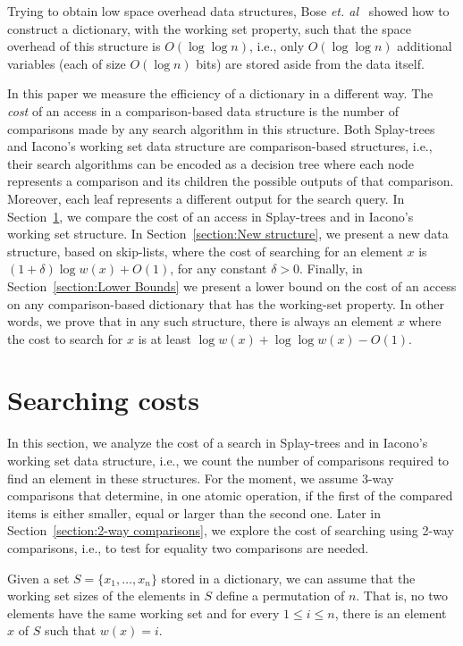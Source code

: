 \documentclass[11pt]{article}       %
\begin{document}
Trying to obtain low space overhead data structures, Bose \emph{et. al}~\cite{bose2012distribution} showed how to construct a dictionary, with the working set property, such that the space overhead of this structure is $O(\log \log n)$, i.e., only $O(\log\log n)$ additional variables (each of size $O(\log n)$ bits) are stored aside from the data itself.


In this paper we measure the efficiency of a dictionary in a different way. The \emph{cost} of an access in a comparison-based data structure is the number of comparisons made by any search algorithm in this structure.
Both Splay-trees and Iacono's working set data structure are comparison-based structures, i.e., their search algorithms can be encoded as a decision tree where each node represents a comparison and its children the possible outputs of that comparison. 
Moreover, each leaf represents a different output for the search query. 
In Section~\ref{section:Comparing searching costs}, we compare the cost of an access in Splay-trees and in Iacono's working set structure. In Section~\ref{section:New structure}, we present a new data structure, based on skip-lists, where the cost of searching for an element $x$ is $(1+\delta) \log w(x) + O(1)$, for any constant $\delta>0$. Finally, in Section~\ref{section:Lower Bounds} we present a lower bound on the cost of an access on any comparison-based dictionary that has the working-set property. In other words, we prove that in any such structure, there is always an element $x$ where the cost to search for $x$ is at least $\log w(x) + \log\log w(x) - O(1)$. 



\section{Searching costs}\label{section:Comparing searching costs}
In this section, we analyze the cost of a search in Splay-trees and in Iacono's working set data structure, i.e., we count the number of comparisons required to find an element in these structures. 
For the moment, we assume 3-way comparisons that determine, in one atomic operation, if the first of the compared items is either smaller, equal or larger than the second one. Later in Section~\ref{section:2-way comparisons}, we explore the cost of searching using 2-way comparisons, i.e., to test for equality two comparisons are needed.

Given a set $S= \{x_1, \ldots, x_n\}$ stored in a dictionary, we can assume that the working set sizes of the elements in $S$ define a permutation of $n$. That is, no two elements have the same working set and for every $1\leq i\leq n$, there is an element $x$ of $S$ such that $w(x) = i$.
\end{document}
